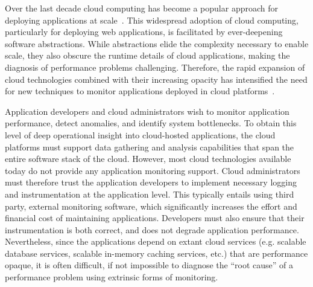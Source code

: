 Over the last decade cloud computing has become a popular approach for deploying
applications at scale~\cite{Antonopoulos:2010:CCP:1855007,Pinheiro:2014:ACC:2618168.2618188}. 
This widespread adoption of cloud computing, particularly for deploying
web applications, is facilitated by ever-deepening software abstractions.
While abstractions elide the complexity necessary to enable scale,
they also obscure the runtime details of cloud applications, 
making the diagnosis of performance problems challenging.
Therefore, the rapid expansion of cloud technologies
combined with their increasing opacity has intensified the need 
for new techniques to
monitor applications deployed in cloud platforms~\cite{DaCunhaRodrigues:2016:MCC:2851613.2851619}. 

Application developers and cloud administrators wish to monitor 
application performance, detect anomalies, and identify system bottlenecks. To obtain 
this level of deep operational insight into cloud-hosted applications, the cloud platforms must support 
data gathering and analysis capabilities that span the entire software stack of the cloud. 
However, most cloud technologies available
today do not provide any application monitoring support. Cloud administrators must therefore trust the
application developers to implement necessary logging and instrumentation 
at the application level. This typically entails using third party, external monitoring software,
which significantly increases the effort and financial cost of maintaining applications.
Developers must also ensure
that their instrumentation is both correct, and does not degrade 
application performance.  Nevertheless, since the applications depend on extant
cloud services (e.g. scalable database services, 
scalable in-memory caching services, etc.) that are performance opaque, it is
often difficult, if not impossible to diagnose the ``root cause'' of a performance problem
using extrinsic forms of monitoring.

